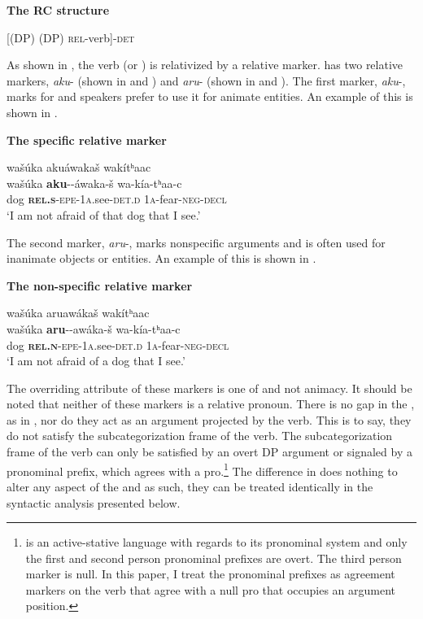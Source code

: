 \documentclass[output=paper]{LSP/langsci}
\begin{document}
\ea \textbf{The  RC structure} \label{boyle6}

[(DP) (DP) \textsc{rel}-verb]-\textsc{det}
\z

As shown in , the verb (or ) is relativized by a relative marker.  has two relative markers, \textit{aku}- (shown in  and ) and \textit{aru}- (shown in  and ). The first marker, \textit{aku}-, marks for  and speakers prefer to use it for animate entities. An example of this is shown in .

\ea \textbf{The  specific relative marker} \label{boyle7}

\glll wa\v{s}\'uka aku\'awaka\v{s} wak\'itʰaac\\
wa\v{s}\'uka \textbf{aku}--\'awaka-\v{s}  wa-k\'ia-tʰaa-c\\
dog \textbf{\textsc{rel.s}}-\textsc{epe}-\textsc{1a}.see-\textsc{det.d} \textsc{1a}-fear-\textsc{neg-decl}\\
\trans `I am not afraid of that dog that I see.' 
\z

The second marker, \textit{aru}-, marks nonspecific arguments and is often used for inanimate objects or entities. An example of this is shown in .

\ea \textbf{The  non-specific relative marker} \label{boyle8}

\glll wa\v{s}\'uka aruaw\'aka\v{s} wak\'itʰaac\\
wa\v{s}\'uka \textbf{aru}--aw\'aka-\v{s}  wa-k\'ia-tʰaa-c\\
dog \textbf{\textsc{rel.n}}-\textsc{epe}-\textsc{1a}.see-\textsc{det.d} \textsc{1a}-fear-\textsc{neg-decl}\\
\trans `I am not afraid of a dog that I see.' 
\z

The overriding attribute of these markers is one of  and not animacy. It should be noted that neither of these markers is a relative pronoun. There is no gap in the , as in , nor do they act as an argument projected by the verb. This is to say, they do not satisfy the subcategorization frame of the verb.  The subcategorization frame of the verb can only be satisfied by an overt DP argument or signaled by a pronominal prefix, which agrees with a pro.\footnote{ is an active-stative language with regards to its pronominal system and only the first and second person pronominal prefixes are overt. The third person marker is null. In this paper, I treat the pronominal prefixes as agreement markers on the verb that agree with a null pro that occupies an argument position.} The difference in  does nothing to alter any aspect of the  and as such, they can be treated identically in the syntactic analysis presented below.
\end{document}
